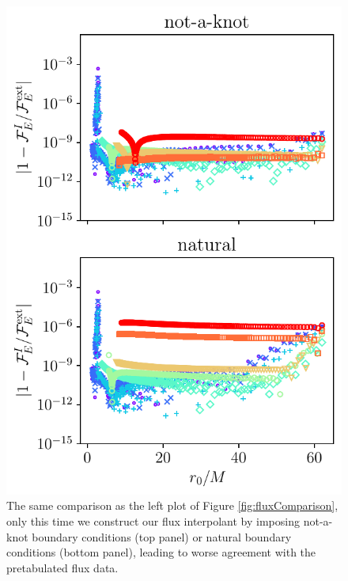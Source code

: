\documentclass[%
 reprint,
 nofootinbib,
 amsmath,amssymb,
 aps,
 prd,
]{revtex4-2}
\begin{document}
\begin{figure}[bhtp]
    \centering
    \includegraphics[width=0.95\linewidth]{figures/boundary_condition_comparison.pdf}
    \caption{The same comparison as the left plot of Figure \ref{fig:fluxComparison}, only this time we construct our flux interpolant by imposing not-a-knot boundary conditions (top panel) or natural boundary conditions (bottom panel), leading to worse agreement with the pretabulated flux data.}
    \label{fig:fluxComparison2}
\end{figure}
\end{document}

